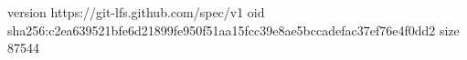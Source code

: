 version https://git-lfs.github.com/spec/v1
oid sha256:c2ea639521bfe6d21899fe950f51aa15fcc39e8ae5bccadefac37ef76e4f0dd2
size 87544
